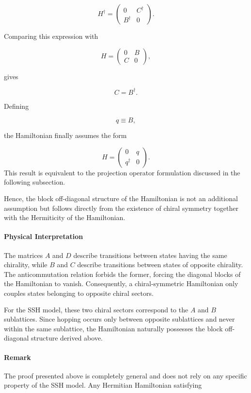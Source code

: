 \documentclass[11pt, a4paper]{article}
\begin{document}
\[
H^\dagger
=
\begin{pmatrix}
0&C^\dagger\\
B^\dagger&0
\end{pmatrix}.
\]

Comparing this expression with

\[
H=
\begin{pmatrix}
0&B\\
C&0
\end{pmatrix},
\]

gives

\[
C=B^\dagger.
\]

Defining

\[
q\equiv B,
\]

the Hamiltonian finally assumes the form

\[
H=
\begin{pmatrix}
0&q\\
q^\dagger&0
\end{pmatrix}.
\]
This result is equivalent to the projection operator formulation discussed in the following subsection.

Hence, the block off-diagonal structure of the Hamiltonian is not an
additional assumption but follows directly from the existence of chiral
symmetry together with the Hermiticity of the Hamiltonian.

\paragraph{Physical Interpretation}

The matrices $A$ and $D$ describe transitions between states having the same
chirality, while $B$ and $C$ describe transitions between states of opposite
chirality. The anticommutation relation forbids the former, forcing the
diagonal blocks of the Hamiltonian to vanish. Consequently, a
chiral-symmetric Hamiltonian only couples states belonging to opposite
chiral sectors.

For the SSH model, these two chiral sectors correspond to the $A$ and $B$
sublattices. Since hopping occurs only between opposite sublattices and
never within the same sublattice, the Hamiltonian naturally possesses the
block off-diagonal structure derived above.

\paragraph{Remark}

The proof presented above is completely general and does not rely on any
specific property of the SSH model. Any Hermitian Hamiltonian satisfying
\end{document}
